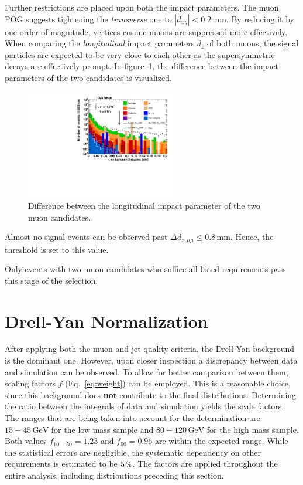 Further restrictions are placed upon both the impact parameters. The muon POG suggests tightening the \textit{transverse} one to $|d_{xy}| < 0.2\,\text{mm}$. By reducing it by one order of magnitude, vertices  cosmic muons are suppressed more effectively. When comparing the \textit{longitudinal} impact parameters $d_z$ of both muons, the signal particles are expected to be very close to each other as the supersymmetric decays are effectively prompt. In figure~\ref{fig:deltadz}, the difference between the impact parameters of the two candidates is visualized.

\begin{figure}[ht!]
  \centering
    \includegraphics[width=0.6\textwidth]{plots/dz_mumu.pdf}
  \caption{Difference between the longitudinal impact parameter of the two muon candidates.}
  \label{fig:deltadz}
\end{figure}

\noindent Almost no signal events can be observed past $\Delta d_{z, \mu\mu} \leq 0.8\,\text{mm}$. Hence, the threshold is set to this value.

Only events with two muon candidates who suffice all listed requirements pass this stage of the selection.



\section{Drell-Yan Normalization}
\label{sec:scaling}

After applying both the muon and jet quality criteria, the Drell-Yan background is the dominant one. However, upon closer inspection a discrepancy between data and simulation can be observed. To allow for better comparison between them, scaling factors $f$ (Eq.~\eqref{eq:weight}) can be employed. This is a reasonable choice, since this background does \textbf{not} contribute to the final distributions. Determining the ratio between the integrals of data and simulation yields the scale factors. The ranges that are being taken into account for the determination are $15 - 45\,\text{GeV}$ for the low mass sample and $80 - 120\,\text{GeV}$ for the high mass sample. Both values $f_{10-50} = 1.23$ and $f_{50} = 0.96$ are within the expected range. While the statistical errors are negligible, the systematic dependency on other requirements is estimated to be $5\,\pct$. The factors are applied throughout the entire analysis, including distributions preceding this section.

